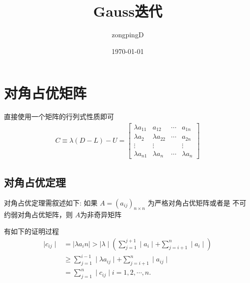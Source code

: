 \documentclass[12pt]{article}
\title{Gauss迭代}
\author{zongpingD}
\date{\today}
\begin{document}
\maketitle

\section{对角占优矩阵}

直接使用一个矩阵的行列式性质即可
\begin{align}
    C\equiv\lambda(D-L)-U=
    \begin{bmatrix}\lambda a_{11}&a_{12}&\cdots&a_{1n}\\ 
        \lambda a_{2}&\lambda a_{22}&\cdots&a_{2n}\\ 
        \vdots&\vdots&&\vdots\\ 
        \lambda a_{n1}&\lambda a_n&\cdots&\lambda a_n
    \end{bmatrix}
\end{align}

\subsection{对角占优定理}
对角占优定理需叙述如下:
如果 $A = (a_{ij})_{n\times n}$ 为严格对角占优矩阵或者是
不可约弱对角占优矩阵，则 $A$为非奇异矩阵

有如下的证明过程
\begin{align*}
    \mid c_{ij}\mid
    & = \mid\lambda a_in\mid>\mid\lambda\mid(\sum\limits_{j=1}^{j+1}\mid a_i\mid+\sum\limits_{j=i+1}^n\mid a_i\mid) \\
    & \geq \sum_{j=1}^{i-1}\mid\lambda a_{ij}\mid+\sum_{j=i+1}^{n}\mid a_{ij}\mid\\
    & =\sum_{j=1}^{n}\mid c_{ij}\mid i=1,2,\cdots,n.
\end{align*}
\end{document}
